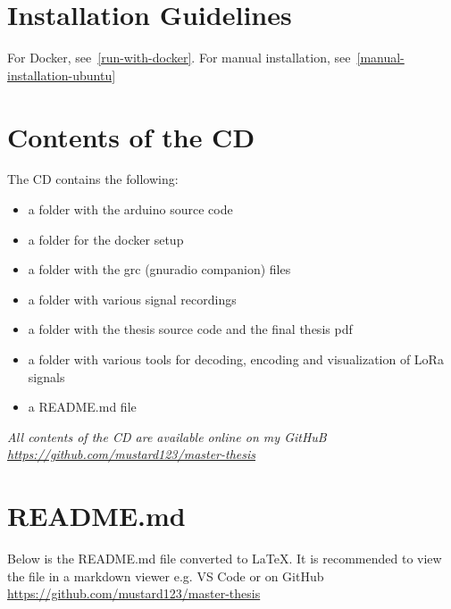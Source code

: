 \appendix

\chapter{Installation Guidelines}
For Docker, see~\ref{run-with-docker}.
For manual installation, see~\ref{manual-installation-ubuntu}

\chapter{Contents of the CD}
The CD contains the following:

\begin{itemize}
    \item a folder with the arduino source code
    \item a folder for the docker setup
    \item a folder with the grc (gnuradio companion) files
    \item a folder with various signal recordings
    \item a folder with the thesis source code and the final thesis pdf
    \item a folder with various tools for decoding, encoding and visualization of LoRa signals
    \item a README.md file
\end{itemize}

\emph{All contents of the CD are available online on my GitHuB \url{https://github.com/mustard123/master-thesis}}


\chapter{README.md}
Below is the README.md file converted to \LaTeX. It is
recommended to view the file in a markdown viewer e.g. VS Code or on GitHub \url{https://github.com/mustard123/master-thesis}



